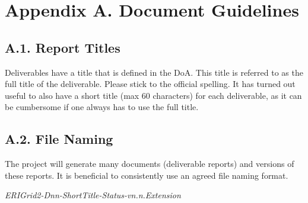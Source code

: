 
\clearpage
\section*{Appendix A. Document Guidelines}
\label{sec:appendix-a}


\subsection*{A.1. Report Titles}
\label{sec:appendix-a1-report-titles}

Deliverables have a title that is defined in the \ac{DoA}. This title is referred to as the full title of the deliverable. Please stick to the official spelling. It has turned out useful to also have a short title (max 60 characters) for each deliverable, as it can be cumbersome if one always has to use the full title. 

\subsection*{A.2. File Naming}
\label{sec:appendix-a2-file-naming}

The project will generate many documents (deliverable reports) and versions of these reports. It is beneficial to consistently use an agreed file naming format. 

\textit{ERIGrid2-Dnn-ShortTitle-Status-vn.n.Extension}


